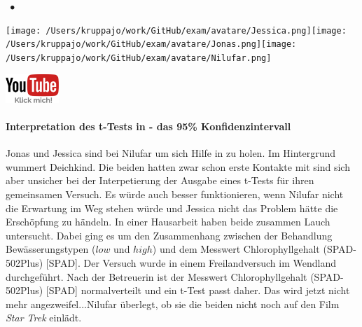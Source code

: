 \documentclass[a4paper, 9pt]{scrartcl}\usepackage[]{graphicx}\usepackage[]{xcolor}
\begin{document}
 
\ifcollection
\begin{flushright}
\tiny\vspace{-3Ex}
\textbf{\examinhaltstart}
\exammodulestatversuch $\;\bullet$
\exammodulebiostat
\vspace{-4Ex}
\end{flushright}
\begin{minipage}[t]{0.5\textwidth}
\texttt{[image: /Users/kruppajo/work/GitHub/exam/avatare/Jessica.png]}\hspace{-4mm}\texttt{[image: /Users/kruppajo/work/GitHub/exam/avatare/Jonas.png]}\hspace{-4mm}\texttt{[image: /Users/kruppajo/work/GitHub/exam/avatare/Nilufar.png]}
\end{minipage}
\begin{minipage}[t]{0.5\textwidth}
\hfill
\href{https://youtu.be/wJqsNV1hOW8}{\includegraphics[width = 2cm]{img/youtube}}
\end{minipage}
\fi



\ifcollection
\paragraph{Interpretation des t-Tests in \Rlogo - das 95\% Konfidenzintervall}
\fi


Jonas und Jessica sind bei Nilufar um sich Hilfe in \Rlogo zu holen.  Im Hintergrund wummert Deichkind. Die beiden hatten zwar schon erste Kontakte mit \Rlogo sind sich aber unsicher bei der Interpetierung der Ausgabe eines t-Tests für ihren gemeinsamen Versuch. Es würde auch besser funktionieren, wenn Nilufar nicht die Erwartung im Weg stehen würde und Jessica nicht das Problem hätte die Erschöpfung zu händeln. In einer Hausarbeit haben beide zusammen Lauch untersucht. Dabei ging es um den Zusammenhang zwischen der Behandlung Bewässerungstypen ($low$ und $high$) und dem Messwert Chlorophyllgehalt (SPAD-502Plus) [SPAD]. Der Versuch wurde in einem Freilandversuch im Wendland durchgeführt. Nach der Betreuerin ist der Messwert Chlorophyllgehalt (SPAD-502Plus) [SPAD] normalverteilt und ein t-Test passt daher. Das wird jetzt nicht mehr angezweifel...Nilufar überlegt, ob sie die beiden nicht noch auf den Film \textit{Star Trek} einlädt.
\end{document}
